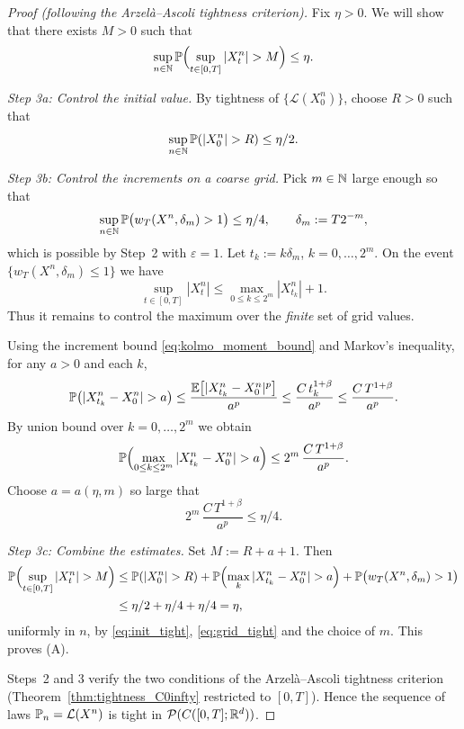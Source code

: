 \begin{proof}[Proof (following the Arzel\`a--Ascoli tightness criterion)]
\medskip
\noindent{}
Fix $\eta>0$. We will show that there exists $M>0$ such that
\[
\sup_{n\in\N}\Pp\Bigl(\sup_{t\in[0,T]}|X_t^n|>M\Bigr)\le \eta.
\]

\smallskip
\emph{Step 3a: Control the initial value.}
By tightness of $\{\mathcal{L}(X_0^n)\}$, choose $R>0$ such that
\begin{equation}\label{eq:init_tight}
\sup_{n\in\N}\Pp(|X_0^n|>R)\le \eta/2.
\end{equation}

\smallskip
\emph{Step 3b: Control the increments on a coarse grid.}
Pick $m\in\mathbb{N}$ large enough so that
\[
\sup_{n\in\mathbb{N}}\mathbb{P}\bigl(w_T(X^n,\delta_m)>1\bigr)\le \eta/4,
\qquad \delta_m:=T2^{-m},
\]
which is possible by Step~2 with $\varepsilon=1$.
Let $t_k:=k\delta_m$, $k=0,\dots,2^m$. On the event $\{w_T(X^n,\delta_m)\le 1\}$ we have
\[
\sup_{t\in[0,T]}|X_t^n|
\le \max_{0\le k\le 2^m}|X_{t_k}^n| + 1.
\]
Thus it remains to control the maximum over the \emph{finite} set of grid values.

Using the increment bound \eqref{eq:kolmo_moment_bound} and Markov's inequality,
for any $a>0$ and each $k$,
\[
\Pp\bigl(|X_{t_k}^n-X_0^n|>a\bigr)
\le \frac{\E\bigl[|X_{t_k}^n-X_0^n|^p\bigr]}{a^p}
\le \frac{C\,t_k^{1+\beta}}{a^p}
\le \frac{C\,T^{1+\beta}}{a^p}.
\]
By union bound over $k=0,\dots,2^m$ we obtain
\[
\Pp\Bigl(\max_{0\le k\le 2^m}|X_{t_k}^n-X_0^n|>a\Bigr)
\le 2^m\,\frac{C\,T^{1+\beta}}{a^p}.
\]
Choose $a=a(\eta,m)$ so large that
\begin{equation}\label{eq:grid_tight}
2^m\,\frac{C\,T^{1+\beta}}{a^p}\le \eta/4.
\end{equation}

\smallskip
\emph{Step 3c: Combine the estimates.}
Set $M:=R+a+1$. Then
\begin{align*}
\Pp\Bigl(\sup_{t\in[0,T]}|X_t^n|>M\Bigr)
&\le \Pp(|X_0^n|>R)
 +\Pp\Bigl(\max_{k}|X_{t_k}^n-X_0^n|>a\Bigr)
 +\Pp\bigl(w_T(X^n,\delta_m)>1\bigr)\\
&\le \eta/2+\eta/4+\eta/4=\eta,
\end{align*}
uniformly in $n$, by \eqref{eq:init_tight}, \eqref{eq:grid_tight} and the choice of $m$.
This proves (A).

\medskip
\noindent{}
Steps~2 and 3 verify the two conditions of the Arzel\`a--Ascoli tightness criterion
(Theorem~\ref{thm:tightness_C0infty} restricted to $[0,T]$).
Hence the sequence of laws $\mathbb{P}_n=\mathcal{L}(X^n)$ is tight in
$\mathcal{P}(C([0,T];\mathbb{R}^d))$.
\end{proof}


